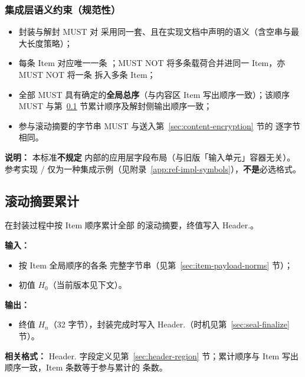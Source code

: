 \subsubsection{集成层语义约束（规范性）}

\begin{itemize}
  \item 封装与解封 MUST 对  采用同一套、且在实现文档中声明的语义（含空串与最大长度策略）；
  \item 每条 Item 对应唯一一条 ；MUST NOT 将多条载荷合并进同一 Item，亦 MUST NOT 将一条  拆入多条 Item；
  \item 全部  MUST 具有确定的\textbf{全局总序}（与内容区 Item 写出顺序一致）；该顺序 MUST 与第~\ref{sec:rolling-hash} 节累计顺序及解封侧输出顺序一致；
  \item 参与滚动摘要的字节串 MUST 与送入第~\ref{sec:content-encryption} 节的  逐字节相同。
\end{itemize}

\textbf{说明：}
本标准\textbf{不规定}  内部的应用层字段布局（与旧版「输入单元」容器无关）。参考实现 / 仅为一种集成示例（见附录~\ref{app:ref-impl-symbols}），\textbf{不是}必选格式。

\subsection{滚动摘要累计}\label{sec:rolling-hash}
在封装过程中按 Item 顺序累计全部  的滚动摘要，终值写入 Header.。

\textbf{输入：}
\begin{itemize}
  \item 按 Item 全局顺序的各条  完整字节串（见第~\ref{sec:item-payload-norms} 节）；
  \item 初值 $H_0$（当前版本见下文）。
\end{itemize}

\textbf{输出：}
\begin{itemize}
  \item \rollhash 终值 $H_n$（32 字节），封装完成时写入 Header.（时机见第~\ref{sec:seal-finalize} 节）。
\end{itemize}

\textbf{相关格式：}
Header. 字段定义见第~\ref{sec:header-region} 节；累计顺序与 Item 写出顺序一致，Item 条数等于参与累计的  条数。

